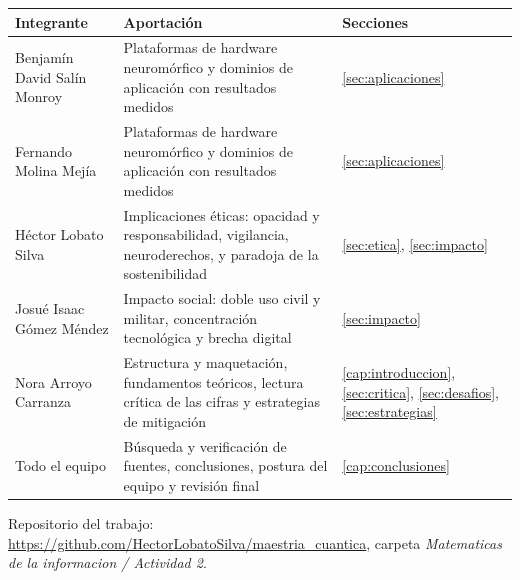 \documentclass[a4paper,11pt,oneside]{book}
\begin{document}
\begin{center}
\label{tab:contribuciones}
\small
\begin{spacing}{1}
\begin{tabularx}{\textwidth}{@{}L{0.62} L{0.95} L{0.43}@{}}
\toprule
\textbf{Integrante} & \textbf{Aportación} & \textbf{Secciones} \\
\midrule
Benjamín David Salín Monroy
  & Plataformas de hardware neuromórfico y dominios de aplicación con
    resultados medidos
  & \ref{sec:aplicaciones} \\
Fernando Molina Mejía
  & Plataformas de hardware neuromórfico y dominios de aplicación con
    resultados medidos
  & \ref{sec:aplicaciones} \\
Héctor Lobato Silva
  & Implicaciones éticas: opacidad y responsabilidad, vigilancia,
    neuroderechos, y paradoja de la sostenibilidad
  & \ref{sec:etica}, \ref{sec:impacto} \\
Josué Isaac Gómez Méndez
  & Impacto social: doble uso civil y militar, concentración tecnológica
    y brecha digital
  & \ref{sec:impacto} \\
Nora Arroyo Carranza
  & Estructura y maquetación, fundamentos teóricos, lectura crítica de
    las cifras y estrategias de mitigación
  & \ref{cap:introduccion}, \ref{sec:critica}, \ref{sec:desafios},
    \ref{sec:estrategias} \\
\midrule
Todo el equipo
  & Búsqueda y verificación de fuentes, conclusiones, postura del equipo
    y revisión final
  & \ref{cap:conclusiones} \\
\bottomrule
\end{tabularx}
\end{spacing}
\end{center}

\begin{sloppypar}
\noindent Repositorio del trabajo:
\url{https://github.com/HectorLobatoSilva/maestria_cuantica}, carpeta
\textit{Matematicas de la informacion / Actividad 2}.
\end{sloppypar}
\end{document}
